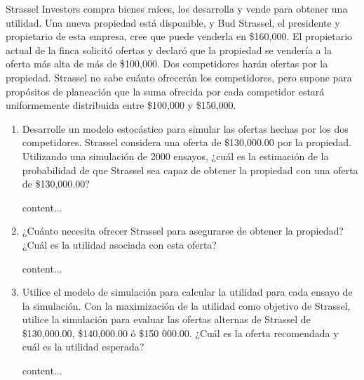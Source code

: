 





\begin{problema}
	Strassel Investors compra bienes raíces, los desarrolla y vende para obtener una utilidad. Una nueva propiedad está disponible, y Bud Strassel, el presidente y propietario de esta empresa, cree que puede venderla en \$160,000. El propietario actual de la finca solicitó ofertas y declaró que la propiedad se vendería a la oferta más alta de más de \$100,000. Dos competidores harán ofertas por la propiedad. Strassel no sabe cuánto ofrecerán los competidores, pero supone para propósitos de planeación que la suma ofrecida por cada competidor estará uniformemente distribuida entre \$100,000 y \$150,000.	
	\begin{enumerate}
		\item Desarrolle un modelo estocástico para simular las ofertas hechas por los dos competidores. Strassel considera una oferta de \$130,000.00 por la propiedad. Utilizando una simulación de 2000 ensayos, ¿cuál es la estimación de la probabilidad de que Strassel sea capaz de obtener la propiedad con una oferta de \$130,000.00? 
		\begin{sol}
			content...
		\end{sol}
		\item ¿Cuánto necesita ofrecer Strassel para asegurarse de obtener la propiedad? ¿Cuál es la utilidad asociada con esta oferta? 
			\begin{sol}
			content...
		\end{sol}
		\item Utilice el modelo de simulación para calcular la utilidad para cada ensayo de la simulación. Con la maximización de la utilidad como objetivo de Strassel, utilice la simulación para evaluar las ofertas alternas de Strassel de \$130,000.00, \$140,000.00 ó \$150 000.00. ¿Cuál es la oferta recomendada y cuál es la utilidad esperada? 
			\begin{sol}
			content...
		\end{sol}
	\end{enumerate}
\end{problema}



